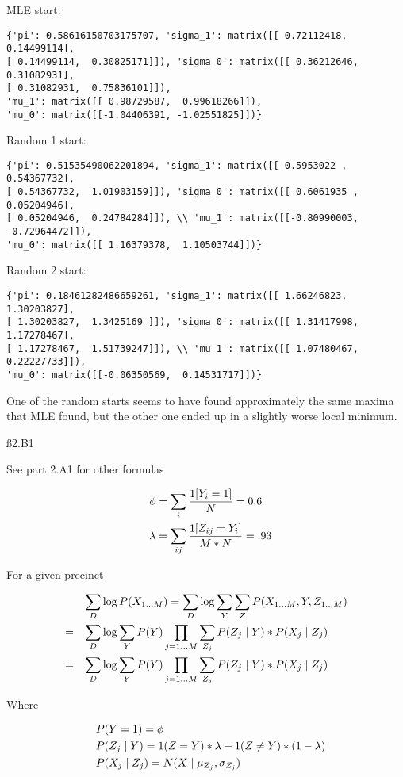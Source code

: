 MLE start: 
\begin{verbatim}
{'pi': 0.58616150703175707, 'sigma_1': matrix([[ 0.72112418,  0.14499114],
[ 0.14499114,  0.30825171]]), 'sigma_0': matrix([[ 0.36212646,  0.31082931],
[ 0.31082931,  0.75836101]]),
'mu_1': matrix([[ 0.98729587,  0.99618266]]),
'mu_0': matrix([[-1.04406391, -1.02551825]])}
\end{verbatim}

Random 1 start:
\begin{verbatim}
{'pi': 0.51535490062201894, 'sigma_1': matrix([[ 0.5953022 ,  0.54367732],
[ 0.54367732,  1.01903159]]), 'sigma_0': matrix([[ 0.6061935 ,  0.05204946],
[ 0.05204946,  0.24784284]]), \\ 'mu_1': matrix([[-0.80990003, -0.72964472]]),
'mu_0': matrix([[ 1.16379378,  1.10503744]])}
\end{verbatim}

Random 2 start:
\begin{verbatim}
{'pi': 0.18461282486659261, 'sigma_1': matrix([[ 1.66246823,  1.30203827],
[ 1.30203827,  1.3425169 ]]), 'sigma_0': matrix([[ 1.31417998,  1.17278467],
[ 1.17278467,  1.51739247]]), \\ 'mu_1': matrix([[ 1.07480467,  0.22227733]]),
'mu_0': matrix([[-0.06350569,  0.14531717]])}
\end{verbatim}

One of the random starts seems to have found approximately the same maxima that MLE found, but the other one ended up in a slightly worse local minimum.

\ss{2.B1}

See part 2.A1 for other formulas

\begin{align*}
& \phi = \sum_{i}\frac{1[Y_{i}=1]}{N} = 0.6 \\ \hspace{3 mm} &
\lambda = \sum_{ij} \frac{1[Z_{ij}=Y_i]}{M*N} = .93
\end{align*}

For a given precinct

\begin{align*}
& \sum_D \log P(X_{1\dots M}) = \sum_D \log \sum_Y \sum_Z P(X_{1\dots M}, Y, Z_{1\dots M}) \\ = \hspace{3 mm} &
\sum_D \log \sum_Y P(Y)\prod_{j=1\dots M} \sum_{Z_j} P(Z_j \mid Y) * P(X_j \mid Z_j) \\ = \hspace{3 mm} &
\sum_D \log \sum_Y P(Y) \prod_{j=1\dots M} \sum_{Z_j} P(Z_j \mid Y) * P(X_j \mid Z_j)
\end{align*}

Where

\begin{align*}
& P(Y=1) = \phi \\ \hspace{3 mm} &
P(Z_j \mid Y) = 1(Z=Y)*\lambda + 1(Z \neq Y) * (1-\lambda) \\ \hspace{3 mm} &
P(X_j \mid Z_j) = N(X \mid \mu_{Z_j}, \sigma_{Z_j})
\end{align*}

